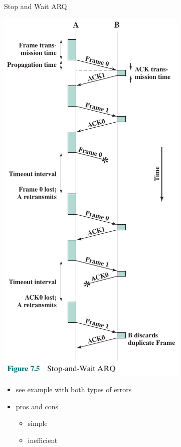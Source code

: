 \documentclass[pdflatex,compress]{beamer}
\begin{document}
\begin{frame}{Stop and Wait ARQ}
	\begin{multicols}{2}
		\begin{center}
			\includegraphics[height=0.9\textheight]{img/img05}
		\end{center}
		\begin{itemize}
			\item see example with both types of errors
			\item pros and cons
			\begin{itemize}
				\item simple
				\item inefficient
			\end{itemize}
		\end{itemize}
		\vfill\null
	\end{multicols}
\end{frame}
\end{document}
